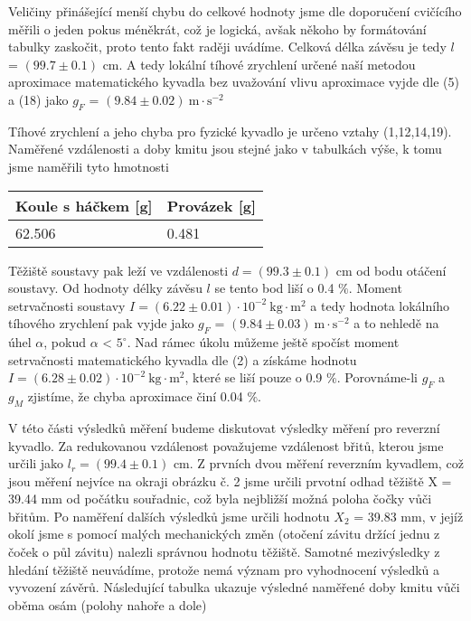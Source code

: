 \documentclass{article}
\begin{document}
Veličiny přinášející menší chybu do celkové hodnoty jsme dle doporučení cvičícího měřili o jeden pokus méněkrát, což je logická, avšak někoho by formátování tabulky zaskočit, proto tento fakt raději uvádíme. Celková délka závěsu je tedy $l$ = $(99.7\pm0.1)$ cm. A tedy lokální tíhové zrychlení určené naší metodou aproximace matematického kyvadla bez uvažování vlivu aproximace vyjde dle (5) a (18) jako $g_{F}$ = $(9.84\pm0.02)\: \mathrm{m \cdot s^{-2}}$ 
\par Tíhové zrychlení a jeho chyba pro fyzické kyvadlo je určeno vztahy (1,12,14,19). Naměřené vzdálenosti a doby kmitu jsou stejné jako v tabulkách výše, k tomu jsme naměřili tyto hmotnosti
\begin{center}
    \label{tab:title}
    \begin{tabular}{ | l |  p{4cm} |} \hline
    Koule s háčkem [g] & Provázek [g]  \\ \hline
    62.506     & 0.481   \\ \hline
    \end{tabular}
\end{center}
Těžiště soustavy pak leží ve vzdálenosti $d = (99.3\pm0.1)$ cm od bodu otáčení soustavy. Od hodnoty délky závěsu $l$ se tento bod liší o 0.4 $\%$.  Moment setrvačnosti soustavy $I = (6.22\pm0.01) \cdot 10^{-2} \: \mathrm{kg \cdot m^{2}} $
a tedy hodnota lokálního tíhového zrychlení pak vyjde jako $g_{F}$ = $(9.84\pm0.03)\: \mathrm{m \cdot s^{-2}}$ a to nehledě na úhel $\alpha$, pokud $\alpha$ < $5^{\circ}$. Nad rámec úkolu můžeme ještě spočíst moment setrvačnosti matematického kyvadla dle (2) a získáme hodnotu $I = (6.28\pm0.02) \cdot 10^{-2} \: \mathrm{kg \cdot m^{2}} $, které se liší pouze o 0.9 $\%$. Porovnáme-li $g_{F}$ a $g_{M}$ zjistíme, že chyba aproximace činí 0.04 $\%$.
\par V této části výsledků měření budeme diskutovat výsledky měření pro reverzní kyvadlo. Za redukovanou vzdálenost považujeme vzdálenost břitů, kterou jsme určili jako $l_{r} = (99.4\pm0.1)$ cm. Z prvních dvou měření reverzním kyvadlem, což jsou měření nejvíce na okraji obrázku č. 2 jsme určili prvotní odhad těžiště X = 39.44 mm od počátku souřadnic, což byla nejbližší možná poloha čočky vůči břitům. Po naměření dalších výsledků jsme určili hodnotu $X_{2}$ = 39.83 mm, v jejíž okolí jsme s pomocí malých mechanických změn (otočení závitu držící jednu z čoček o půl závitu) nalezli správnou hodnotu těžiště. Samotné mezivýsledky z hledání těžiště neuvádíme, protože nemá význam pro vyhodnocení výsledků a vyvození závěrů. Následující tabulka ukazuje výsledné naměřené doby kmitu vůči oběma osám (polohy nahoře a dole)
\end{document}
